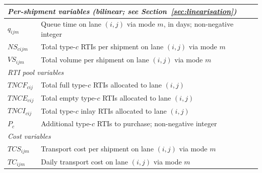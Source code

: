 \begin{longtable}{|p{}|p{}|}
\hline
\multicolumn{2}{|l|}{\textit{Per-shipment variables
    (\emph{bilinear}; see Section~\ref{sec:linearisation})}}\\ \hline
$q_{ijm}$
  & Queue time on lane $(i,j)$ via mode $m$, in days;
    non-negative integer \\
$NS_{cijm}$
  & Total type-$c$ RTIs per shipment on lane $(i,j)$ via mode $m$ \\
$VS_{ijm}$
  & Total volume per shipment on lane $(i,j)$ via mode $m$ \\
\hline
\multicolumn{2}{|l|}{\textit{RTI pool variables}}\\ \hline
$TNCF_{cij}$
  & Total full type-$c$ RTIs allocated to lane $(i,j)$ \\
$TNCE_{cij}$
  & Total empty type-$c$ RTIs allocated to lane $(i,j)$ \\
$TNCI_{cij}$
  & Total type-$c$ inlay RTIs allocated to lane $(i,j)$ \\
$P_{c}$
  & Additional type-$c$ RTIs to purchase; non-negative integer \\
\hline
\multicolumn{2}{|l|}{\textit{Cost variables}}\\ \hline
$TCS_{ijm}$
  & Transport cost per shipment on lane $(i,j)$ via mode $m$ \\
$TC_{ijm}$
  & Daily transport cost on lane $(i,j)$ via mode $m$ \\
\hline
\end{longtable}


